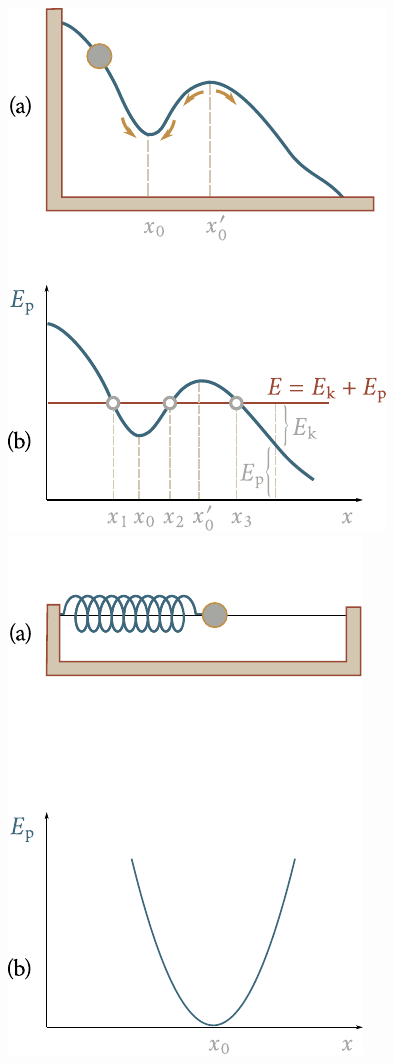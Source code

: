 \begin{figure}[!htb]
	\begin{minipage}[t]{0.5\linewidth}
		\begin{center}
			\includegraphics[scale=0.95]{figures/ch_03/fig_3_14.pdf}
			\caption[]{}
			\label{fig:3_14}
		\end{center}
	\end{minipage}
	\hspace{-0.05cm}
	\begin{minipage}[t]{0.5\linewidth}
		\begin{center}
			\includegraphics[scale=0.95]{figures/ch_03/fig_3_15.pdf}

\end{center}
\end{minipage}
\end{figure}

